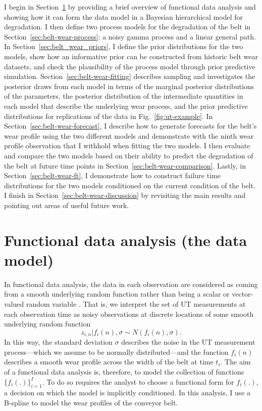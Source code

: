 I begin in Section~\ref{sec:belt-wear-fda} by providing a brief overview of functional data analysis and showing how it can form the data model in a Bayesian hierarchical model for degradation. I then define two process models for the degradation of the belt in Section~\ref{sec:belt-wear-process}: a noisy gamma process and a linear general path. In Section~\ref{sec:belt_wear_priors}, I define the prior distributions for the two models, show how an informative prior can be constructed from historic belt wear datasets, and check the plausibility of the process model through prior predictive simulation. Section~\ref{sec:belt-wear-fitting} describes sampling and investigates the posterior draws from each model in terms of the marginal posterior distributions of the parameters, the posterior distribution of the intermediate quantities in each model that describe the underlying wear process, and the prior predictive distributions for replications of the data in Fig.~\ref{fig:ut-example}. In Section~\ref{sec:belt-wear-forecast}, I describe how to generate forecasts for the belt's wear profile using the two different models and demonstrate with the ninth wear profile observation that I withhold when fitting the two models. I then evaluate and compare the two models based on their ability to predict the degradation of the belt at future time points in Section~\ref{sec:belt-wear-comparison}. Lastly, in Section~\ref{sec:belt-wear-ft}, I demonstrate how to construct failure time distributions for the two models conditioned on the current condition of the belt. I finish in Section~\ref{sec:belt-wear-discussion} by revisiting the main results and pointing out areas of useful future work.

\section{Functional data analysis (the data model)} \label{sec:belt-wear-fda}
In functional data analysis, the data in each observation are considered as coming from a smooth underlying random function rather than being a scalar or vector-valued random variable \citep[p. 512]{BDA2020}. That is, we interpret the set of UT measurements at each observation time as noisy observations at discrete locations of some smooth underlying random function
\begin{equation}
  z_{i, n}|f_i(n),\sigma \sim N(f_i(n), \sigma).
  \label{eq:fda}
\end{equation}
In this way, the standard deviation $\sigma$ describes the noise in the UT measurement process---which we assume to be normally distributed---and the function $f_i(n)$ describes a smooth wear profile across the width of the belt at time $t_i$. The aim of a functional data analysis is, therefore, to model the collection of functions $\{f_i(.)\}^I_{i = 1}$. To do so requires the analyst to choose a functional form for $f_i(.)$, a decision on which the model is implicitly conditioned. In this analysis, I use a B-spline to model the wear profiles of the conveyor belt.

